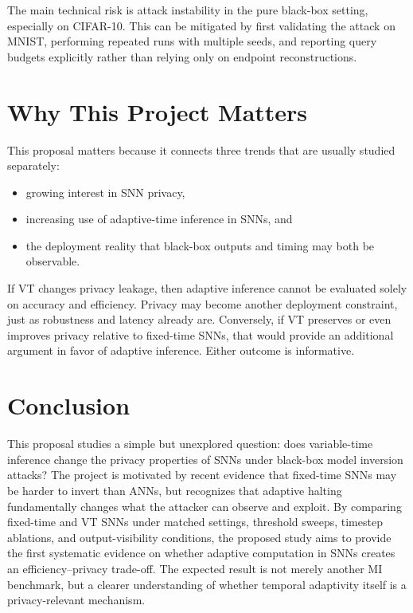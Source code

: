 \documentclass[11pt]{article}
\begin{document}
The main technical risk is attack instability in the pure black-box setting, especially on CIFAR-10. This can be mitigated by first validating the attack on MNIST, performing repeated runs with multiple seeds, and reporting query budgets explicitly rather than relying only on endpoint reconstructions.

\section{Why This Project Matters}
This proposal matters because it connects three trends that are usually studied separately:
\begin{itemize}[leftmargin=1.3em]
\item growing interest in SNN privacy,
\item increasing use of adaptive-time inference in SNNs, and
\item the deployment reality that black-box outputs and timing may both be observable.
\end{itemize}

If VT changes privacy leakage, then adaptive inference cannot be evaluated solely on accuracy and efficiency. Privacy may become another deployment constraint, just as robustness and latency already are. Conversely, if VT preserves or even improves privacy relative to fixed-time SNNs, that would provide an additional argument in favor of adaptive inference. Either outcome is informative.

\section{Conclusion}
This proposal studies a simple but unexplored question: does variable-time inference change the privacy properties of SNNs under black-box model inversion attacks? The project is motivated by recent evidence that fixed-time SNNs may be harder to invert than ANNs, but recognizes that adaptive halting fundamentally changes what the attacker can observe and exploit. By comparing fixed-time and VT SNNs under matched settings, threshold sweeps, timestep ablations, and output-visibility conditions, the proposed study aims to provide the first systematic evidence on whether adaptive computation in SNNs creates an efficiency--privacy trade-off. The expected result is not merely another MI benchmark, but a clearer understanding of whether temporal adaptivity itself is a privacy-relevant mechanism.
\end{document}
